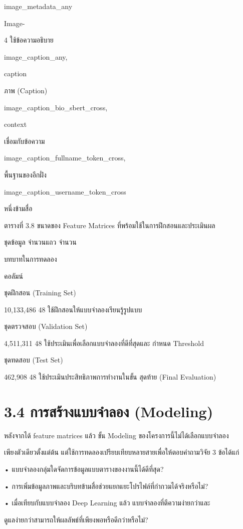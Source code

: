 \documentclass[12pt,a4paper]{report}
\begin{document}
image\_metadata\_any\par
Image-\par
4 ใช้ข้อความอธิบาย\par
image\_caption\_any,\par
caption\par
ภาพ (Caption)\par
image\_caption\_bio\_sbert\_cross,\par
context\par
เชื่อมกับข้อความ\par
image\_caption\_fullname\_token\_cross,\par
พื้นฐานของอีกฝั่ง\par
image\_caption\_username\_token\_cross\par
หนึ่งข้ามสื่อ\par
\clearpage
\begin{center}\small ตารางที่ 3.8 ขนาดของ Feature Matrices ที่พร้อมใช้ในการฝึกสอนและประเมินผล\end{center}
ชุดข้อมูล จำนวนแถว จำนวน\par
บทบาทในการทดลอง\par
คอลัมน์\par
ชุดฝึกสอน (Training Set)\par
10,133,486 48 ใช้ฝึกสอนให้แบบจำลองเรียนรู้รูปแบบ\par
ชุดตรวจสอบ (Validation Set)\par
4,511,311 48 ใช้ประเมินเพื่อเลือกแบบจำลองที่ดีที่สุดและ กำหนด Threshold\par
ชุดทดสอบ (Test Set)\par
462,908 48 ใช้ประเมินประสิทธิภาพการทำงานในขั้น สุดท้าย (Final Evaluation)\par
\section*{3.4 การสร้างแบบจำลอง (Modeling)}
หลังจากได้ feature matrices แล้ว ขั้น Modeling ของโครงการนี้ไม่ได้เลือกแบบจำลอง\par
เพียงตัวเดียวตั้งแต่ต้น แต่ใช้การทดลองเปรียบเทียบหลายสายเพื่อให้ตอบคำถามวิจัย 3 ข้อได้แก่\par
\noindent • แบบจำลองกลุ่มใดจัดการข้อมูลแบบตารางของงานนี้ได้ดีที่สุด?\par
\noindent • การเพิ่มข้อมูลภาพและบริบทข้ามสื่อช่วยแยกแยะโปรไฟล์ที่กำกวมได้จริงหรือไม่?\par
\noindent • เมื่อเทียบกับแบบจำลอง Deep Learning แล้ว แบบจำลองที่ตีความง่ายกว่าและ\par
ดูแลง่ายกว่าสามารถให้ผลลัพธ์ที่เพียงพอหรือดีกว่าหรือไม่?\par
\end{document}
